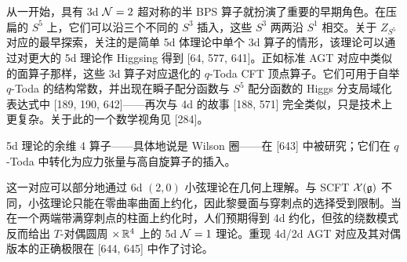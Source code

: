 从一开始，具有 3d $\mathcal{N}=2$ 超对称的半 BPS 算子就扮演了重要的早期角色。在压扁的 $S^5$ 上，它们可以沿三个不同的 $S^3$ 插入，这些 $S^3$ 两两沿 $S^1$ 相交。关于 $Z_{S^5}$ 对应的最早探索，关注的是简单 5d 体理论中单个 3d 算子的情形，该理论可以通过对更大的 5d 理论作 Higgsing 得到 [64, 577, 641]。正如标准 AGT 对应中类似的面算子那样，这些 3d 算子对应退化的 $q$-Toda CFT 顶点算子。它们可用于自举 $q$-Toda 的结构常数，并出现在瞬子配分函数与 $S^5$ 配分函数的 Higgs 分支局域化表达式中 [189, 190, 642]------再次与 4d 的故事 [188, 571] 完全类似，只是技术上更复杂。关于此的一个数学视角见 [284]。

5d 理论的余维 4 算子------具体地说是 Wilson 圈------在 [643] 中被研究；它们在 $q$-Toda 中转化为应力张量与高自旋算子的插入。

这一对应可以部分地通过 6d $(2,0)$ 小弦理论在几何上理解。与 SCFT $\mathcal{X}(\mathfrak{g})$ 不同，小弦理论只能在零曲率曲面上约化，因此黎曼面与穿刺点的选择受到限制。当在一个两端带满穿刺点的柱面上约化时，人们预期得到 4d 约化，但弦的绕数模式反而给出 $T$-对偶圆周 $\times\,\mathbb{R}^4$ 上的 5d $\mathcal{N}=1$ 理论。重现 4d/2d AGT 对应及其对偶版本的正确极限在 [644, 645] 中作了讨论。
